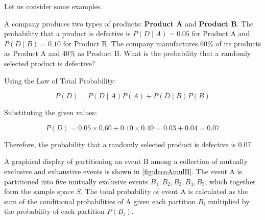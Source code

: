 Let us consider some examples.

\begin{example}
    A company produces two types of products: \textbf{Product A} and \textbf{Product B}. The probability that a product is defective is \( P(D \mid A) = 0.05 \) for Product A and \( P(D \mid B) = 0.10 \) for Product B. The company manufactures 60\% of its products as Product A and 40\% as Product B. What is the probability that a randomly selected product is defective?
\end{example}

\begin{solution}
    Using the Law of Total Probability:

    \[
    P(D) = P(D \mid A) P(A) + P(D \mid B) P(B)
    \]

    Substituting the given values:

    \[
    P(D) = 0.05 \times 0.60 + 0.10 \times 0.40 = 0.03 + 0.04 = 0.07
    \]

    Therefore, the probability that a randomly selected product is defective is 0.07.
\end{solution}

A graphical display of partitioning an event B
among a collection of mutually exclusive and exhaustive events is shown in \autoref{fig:decoAmulB}. The event A is partitioned into five mutually exclusive events \( B_1, B_2, B_3, B_4, B_5 \), which together form the sample space \( S \). The total probability of event A is calculated as the sum of the conditional probabilities of A given each partition \( B_i \) multiplied by the probability of each partition \( P(B_i) \).

